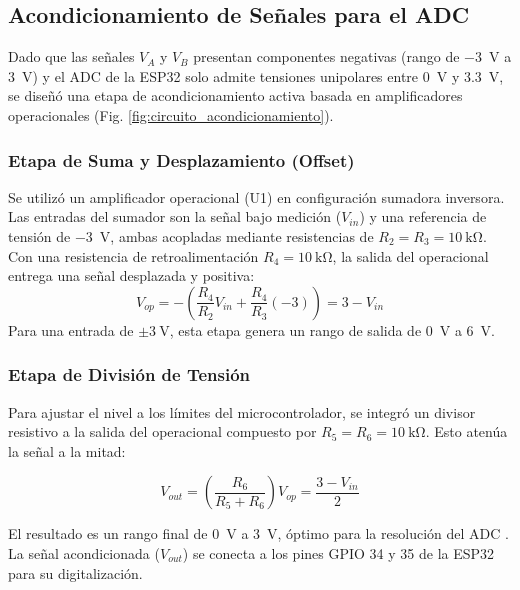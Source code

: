 \documentclass[conference]{IEEEtran}
\begin{document}
\subsection{Acondicionamiento de Señales para el ADC}
\label{subsec:acondicionamiento}

Dado que las señales $V_A$ y $V_B$ presentan componentes negativas (rango de \SI{-3}{\volt} a \SI{3}{\volt}) y el ADC de la ESP32 solo admite tensiones unipolares entre \SI{0}{\volt} y \SI{3.3}{\volt}, se diseñó una etapa de acondicionamiento activa basada en amplificadores operacionales (Fig. \ref{fig:circuito_acondicionamiento}).

\subsubsection{Etapa de Suma y Desplazamiento (Offset)}
Se utilizó un amplificador operacional (U1) en configuración sumadora inversora. Las entradas del sumador son la señal bajo medición ($V_{in}$) y una referencia de tensión de \SI{-3}{\volt}, ambas acopladas mediante resistencias de $R_2 = R_3 = \SI{10}{\kilo\ohm}$. Con una resistencia de retroalimentación $R_4 = \SI{10}{\kilo\ohm}$, la salida del operacional entrega una señal desplazada y positiva:
\begin{equation}
    V_{op} = -\left( \frac{R_4}{R_2}V_{in} + \frac{R_4}{R_3}(-3) \right) = 3 - V_{in}
\end{equation}
Para una entrada de $\pm\SI{3}{\volt}$, esta etapa genera un rango de salida de \SI{0}{\volt} a \SI{6}{\volt}.

\subsubsection{Etapa de División de Tensión}
Para ajustar el nivel a los límites del microcontrolador, se integró un divisor resistivo a la salida del operacional compuesto por $R_5 = R_6 = \SI{10}{\kilo\ohm}$. Esto atenúa la señal a la mitad:

\begin{equation}
   V_{out}=\left( \frac{R_6}{R_5 + R_6} \right) V_{op} =  \frac{3-V_{in}}{2}
\end{equation}

El resultado es un rango final de \SI{0}{\volt} a \SI{3}{\volt}, óptimo para la resolución del ADC \cite{dunn_instrumentacion}. La señal acondicionada ($V_{out}$) se conecta a los pines GPIO 34 y 35 de la ESP32 para su digitalización.
\end{document}

